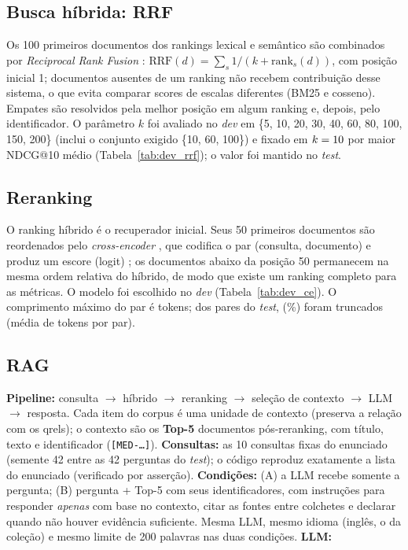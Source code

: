 \subsection{Busca híbrida: RRF}
Os 100 primeiros documentos dos rankings lexical e semântico são combinados por \emph{Reciprocal Rank Fusion} \cite{cormack2009rrf}: $\mathrm{RRF}(d)=\sum_{s}1/(k+\mathrm{rank}_s(d))$, com posição inicial 1; documentos ausentes de um ranking não recebem contribuição desse sistema, o que evita comparar scores de escalas diferentes (BM25 e cosseno). Empates são resolvidos pela melhor posição em algum ranking e, depois, pelo identificador. O parâmetro $k$ foi avaliado no \emph{dev} em \{5, 10, 20, 30, 40, 60, 80, 100, 150, 200\} (inclui o conjunto exigido \{10, 60, 100\}) e fixado em $k=10$ por maior NDCG@10 médio (Tabela~\ref{tab:dev_rrf}); o valor foi mantido no \emph{test}.

\subsection{Reranking}
O ranking híbrido é o recuperador inicial. Seus 50 primeiros documentos são reordenados pelo \emph{cross-encoder} \texttt{\CEName}, que codifica o par (consulta, documento) e produz um escore (logit) \cite{nogueira2019rerank}; os documentos abaixo da posição 50 permanecem na mesma ordem relativa do híbrido, de modo que existe um ranking completo para as métricas. O modelo foi escolhido no \emph{dev} (Tabela~\ref{tab:dev_ce}). O comprimento máximo do par é \CEMaxLen{} tokens; dos \CEPairs{} pares do \emph{test}, \CETruncPairs{} (\CETruncPct\%) foram truncados (média de \CEPairTokens{} tokens por par).

\subsection{RAG}
\textbf{Pipeline:} consulta $\rightarrow$ híbrido $\rightarrow$ reranking $\rightarrow$ seleção de contexto $\rightarrow$ LLM $\rightarrow$ resposta. Cada item do corpus é uma unidade de contexto (preserva a relação com os qrels); o contexto são os \textbf{Top-5} documentos pós-reranking, com título, texto e identificador (\texttt{[MED-\ldots]}). \textbf{Consultas:} as 10 consultas fixas do enunciado (semente 42 entre as 42 perguntas do \emph{test}); o código reproduz exatamente a lista do enunciado (verificado por asserção). \textbf{Condições:} (A) a LLM recebe somente a pergunta; (B) pergunta + Top-5 com seus identificadores, com instruções para responder \emph{apenas} com base no contexto, citar as fontes entre colchetes e declarar quando não houver evidência suficiente. Mesma LLM, mesmo idioma (inglês, o da coleção) e mesmo limite de 200 palavras nas duas condições. \textbf{LLM:} \LLMDescricao

